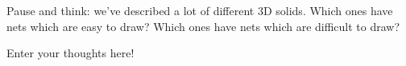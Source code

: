 \documentclass{ximera}
\begin{document}
\begin{question}
Pause and think: we've described a lot of different 3D solids. Which ones have nets which are easy to draw? Which ones have nets which are difficult to draw?
\begin{freeResponse}
Enter your thoughts here!
\end{freeResponse}
\end{question}
\end{document}
